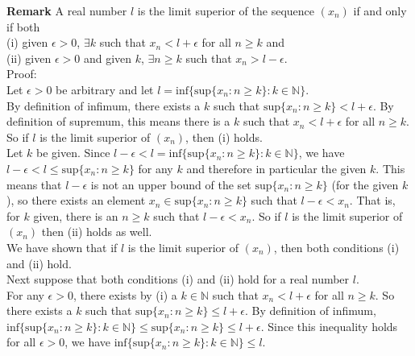 \documentclass[a4paper]{article}
\begin{document}
{\bf Remark} A real number $l$ is the limit superior of the sequence $(x_n)$ if and only if both\\
(i) given $\epsilon >0$, $\exists k$ such that $x_n < l+\epsilon$ for all $n \geq k$ and \\
(ii) given $\epsilon >0$ and given $k$, $\exists n \geq k$ such that $x_n > l - \epsilon$.\\

Proof:\\

Let $\epsilon > 0$ be arbitrary and let $l = \text{inf}\{\text{sup} \{x_n : n \geq k\} : k \in \mathbb{N}\}$.\\

By definition of infimum, there exists a $k$ such that $\text{sup} \{x_n : n \geq k\} < l+\epsilon$. By definition of supremum, this means there is a $k$ such that $x_n < l + \epsilon$ for all $n \geq k$. So if $l$ is the limit superior of $(x_n)$, then (i) holds. \\

Let $k$ be given. Since $l-\epsilon < l = \text{inf}\{\text{sup} \{x_n : n \geq k\} : k \in \mathbb{N}\}$, we have $l-\epsilon<l\leq \text{sup} \{x_n : n \geq k\}$ for any $k$ and therefore in particular the given $k$. This means that $l-\epsilon$ is not an upper bound of the set $\text{sup} \{x_n : n \geq k\}$ (for the given $k$), so there exists an element $x_n \in \text{sup} \{x_n : n \geq k\}$ such that $l-\epsilon < x_n$. That is, for $k$ given, there is an $n\geq k$ such that $l-\epsilon < x_n$. So if $l$ is the limit superior of $(x_n)$ then (ii) holds as well.\\

We have shown that if $l$ is the limit superior of $(x_n)$, then both conditions (i) and (ii) hold.\\

Next suppose that both conditions (i) and (ii) hold for a real number $l$.\\

For any $\epsilon > 0$, there exists by (i) a $k \in \mathbb{N}$ such that $x_n < l+\epsilon$ for all $n\geq k$. So there exists a $k$ such that $\text{sup} \{x_n : n \geq k\} \leq l+\epsilon$. By definition of infimum, $\text{inf}\{\text{sup} \{x_n : n \geq k\} : k \in \mathbb{N}\} \leq \text{sup} \{x_n : n \geq k\} \leq l+\epsilon$. Since this inequality holds for all $\epsilon > 0$, we have $\text{inf}\{\text{sup} \{x_n : n \geq k\} : k \in \mathbb{N}\} \leq l$. \\
\end{document}
